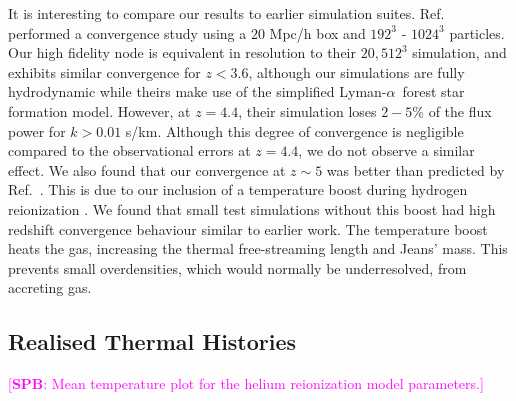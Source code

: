 \documentclass[a4paper,11pt]{article}
\newcommand{\spb}[1]{{\textcolor{magenta}{[{\bf SPB}: #1]}}}
\newcommand{\Lya}{Lyman-$\alpha$}
\begin{document}
It is interesting to compare our results to earlier simulation suites. Ref.~\cite{Borde:2014} performed a convergence study using a $20$ Mpc/h box and $192^3$ - $1024^3$ particles. Our high fidelity node is equivalent in resolution to their $20, 512^3$ simulation, and exhibits similar convergence for $z < 3.6$, although our simulations are fully hydrodynamic while theirs make use of the simplified \Lya~forest star formation model. However, at $z=4.4$, their simulation loses $2-5\%$ of the flux power for $k > 0.01$ s/km. Although this degree of convergence is negligible compared to the observational errors at $z=4.4$, we do not observe a similar effect.
We also found that our convergence at $z \sim 5$ was better than predicted by Ref.~\cite{2009MNRAS.398L..26B}. This is due to our inclusion of a temperature boost during hydrogen reionization \cite{DAloisio:2019}. We found that small test simulations without this boost had high redshift convergence behaviour similar to earlier work. The temperature boost heats the gas, increasing the thermal free-streaming length and Jeans' mass. This prevents small overdensities, which would normally be underresolved, from accreting gas.



\subsection{Realised Thermal Histories}
\spb{Mean temperature plot for the helium reionization model parameters.}
\end{document}
